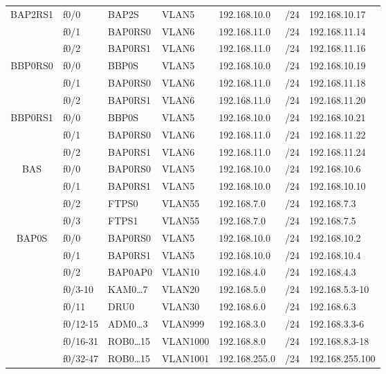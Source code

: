 \documentclass[12pt,a4paper,titlepage]{article}
\begin{document}
{\begin{longtable}{|c|l|l|l|l|c|l|}
    \multirow{3}{*}{BAP2RS1}
    & f0/0 & BAP2S & VLAN5 & 192.168.10.0 & /24 & 192.168.10.17
 \\
    \cline{2-7}
    & f0/1 & BAP0RS0 & VLAN6  & 192.168.11.0 & /24 & 192.168.11.14
 \\
    \cline{2-7}
    & f0/2 & BAP0RS1 & VLAN6  & 192.168.11.0 & /24 & 192.168.11.16
 \\
    \hline
    
    \multirow{3}{*}{BBP0RS0}
    & f0/0 & BBP0S & VLAN5 & 192.168.10.0 & /24 & 192.168.10.19
 \\
    \cline{2-7}
    & f0/1 & BAP0RS0 & VLAN6  & 192.168.11.0 & /24 & 192.168.11.18
 \\
    \cline{2-7}
    & f0/2 & BAP0RS1 & VLAN6  & 192.168.11.0 & /24 & 192.168.11.20
 \\
    \hline
    
    \multirow{3}{*}{BBP0RS1}
    & f0/0 & BBP0S & VLAN5 & 192.168.10.0 & /24 & 192.168.10.21
 \\
    \cline{2-7}
    & f0/1 & BAP0RS0 & VLAN6 & 192.168.11.0 & /24 & 192.168.11.22
 \\
    \cline{2-7}
    & f0/2 & BAP0RS1 & VLAN6  & 192.168.11.0 & /24 & 192.168.11.24
 \\
    \hline
    
    \multirow{4}{*}{BAS}
    & f0/0 & BAP0RS0 & VLAN5 & 192.168.10.0 & /24 & 192.168.10.6
 \\
    \cline{2-7}
    & f0/1 & BAP0RS1 & VLAN5 & 192.168.10.0 & /24 & 192.168.10.10
 \\
    \cline{2-7}
    & f0/2 & FTPS0 & VLAN55 & 192.168.7.0 & /24 & 192.168.7.3
 \\
    \cline{2-7}
    & f0/3 & FTPS1 & VLAN55 & 192.168.7.0 & /24 & 192.168.7.5
 \\
    \hline
    
    \multirow{8}{*}{BAP0S}
    & f0/0 & BAP0RS0 & VLAN5 & 192.168.10.0 & /24 & 192.168.10.2
 \\
    \cline{2-7}
    & f0/1 & BAP0RS1 & VLAN5 & 192.168.10.0 & /24 & 192.168.10.4
 \\
    \cline{2-7}
    & f0/2 & BAP0AP0 & VLAN10 & 192.168.4.0 & /24 & 192.168.4.3
 \\
    \cline{2-7}
    & f0/3-10 & KAM0…7 & VLAN20 & 192.168.5.0 & /24 & 192.168.5.3-10
 \\
    \cline{2-7}
    & f0/11 & DRU0 & VLAN30 & 192.168.6.0 & /24 & 192.168.6.3
 \\
    \cline{2-7}
    & f0/12-15 & ADM0…3 & VLAN999 & 192.168.3.0 & /24 & 192.168.3.3-6
 \\
    \cline{2-7}
    & f0/16-31 & ROB0…15 & VLAN1000 & 192.168.8.0 & /24 & 192.168.8.3-18
 \\
    \cline{2-7}
    & f0/32-47 & ROB0…15 & VLAN1001 & 192.168.255.0 & /24 & 192.168.255.100 \\
    \hline
    

\end{longtable}}
\end{document}
